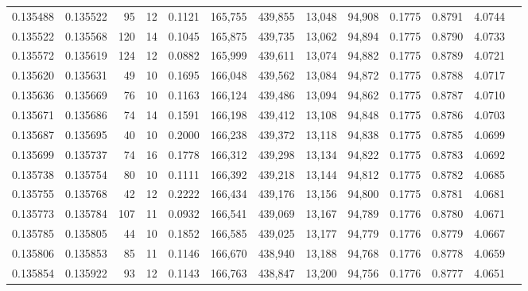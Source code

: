 \begin{tabular}{rrrrrrrrrrrrr}
0.135488 & 0.135522 &    95 &  12 &                                     0.1121 & 165,755 & 439,855 &  13,048 &  94,908 & 0.1775 & 0.8791 & 4.0744 \\
0.135522 & 0.135568 &   120 &  14 &                                     0.1045 & 165,875 & 439,735 &  13,062 &  94,894 & 0.1775 & 0.8790 & 4.0733 \\
0.135572 & 0.135619 &   124 &  12 &                                     0.0882 & 165,999 & 439,611 &  13,074 &  94,882 & 0.1775 & 0.8789 & 4.0721 \\
0.135620 & 0.135631 &    49 &  10 &                                     0.1695 & 166,048 & 439,562 &  13,084 &  94,872 & 0.1775 & 0.8788 & 4.0717 \\
0.135636 & 0.135669 &    76 &  10 &                                     0.1163 & 166,124 & 439,486 &  13,094 &  94,862 & 0.1775 & 0.8787 & 4.0710 \\
0.135671 & 0.135686 &    74 &  14 &                                     0.1591 & 166,198 & 439,412 &  13,108 &  94,848 & 0.1775 & 0.8786 & 4.0703 \\
0.135687 & 0.135695 &    40 &  10 &                                     0.2000 & 166,238 & 439,372 &  13,118 &  94,838 & 0.1775 & 0.8785 & 4.0699 \\
0.135699 & 0.135737 &    74 &  16 &                                     0.1778 & 166,312 & 439,298 &  13,134 &  94,822 & 0.1775 & 0.8783 & 4.0692 \\
0.135738 & 0.135754 &    80 &  10 &                                     0.1111 & 166,392 & 439,218 &  13,144 &  94,812 & 0.1775 & 0.8782 & 4.0685 \\
0.135755 & 0.135768 &    42 &  12 &                                     0.2222 & 166,434 & 439,176 &  13,156 &  94,800 & 0.1775 & 0.8781 & 4.0681 \\
0.135773 & 0.135784 &   107 &  11 &                                     0.0932 & 166,541 & 439,069 &  13,167 &  94,789 & 0.1776 & 0.8780 & 4.0671 \\
0.135785 & 0.135805 &    44 &  10 &                                     0.1852 & 166,585 & 439,025 &  13,177 &  94,779 & 0.1776 & 0.8779 & 4.0667 \\
0.135806 & 0.135853 &    85 &  11 &                                     0.1146 & 166,670 & 438,940 &  13,188 &  94,768 & 0.1776 & 0.8778 & 4.0659 \\
0.135854 & 0.135922 &    93 &  12 &                                     0.1143 & 166,763 & 438,847 &  13,200 &  94,756 & 0.1776 & 0.8777 & 4.0651 \\

\end{tabular}
